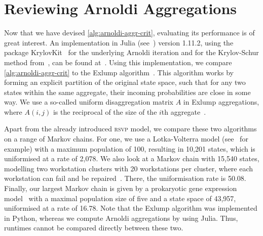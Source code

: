 \documentclass[runningheads]{llncs}
\newcommand*{\abbrev}[1]{\textsc{#1}}
\begin{document}
\section{Reviewing Arnoldi Aggregations}\label{sec:review}
Now that we have devised \cref{alg:arnoldi-aggr-crit}, evaluating its performance is of great interest.
An implementation in Julia (see~\cite{bezanson2017julia}) version 1.11.2, using the package KrylovKit~\cite{haegeman2024krylovkit} for the underlying Arnoldi iteration and for the Krylov-Schur method from~\cite{stewart2002krylovschur}, can be found at~\cite{sonnentag2025implementation}.
Using this implementation, we compare \cref{alg:arnoldi-aggr-crit} to the Exlump algorithm~\cite[Algorithm~3]{michel2025formalbounds}.
This algorithm works by forming an explicit partition of the original state space, such that for any two states within the same aggregate, their incoming probabilities are close in some way.
We use a so-called uniform disaggregation matrix $A$ in Exlump aggregations, where $A(i, j)$ is the reciprocal of the size of the $i$th aggregate~\cite[p.~14]{michel2025formalbounds}.

Apart from the already introduced \abbrev{rsvp} model, we compare these two algorithms on a range of Markov chains.
For one, we use a Lotka-Volterra model (see~\cite{gillespie1977lotkavolterra} for example) with a maximum population of 100, resulting in 10{,}201 states, which is uniformised at a rate of 2{,}078.
We also look at a Markov chain with 15{,}540 states, modelling two workstation clusters with 20 workstations per cluster, where each workstation can fail and be repaired~\cite{haverkort2000workstation}.
There, the uniformisation rate is 50.08.
Finally, our largest Markov chain is given by a prokaryotic gene expression model~\cite{kierzek2001genemodel} with a maximal population size of five and a state space of 43{,}957, uniformised at a rate of 16.78.
Note that the Exlump algorithm was implemented in Python, whereas we compute Arnoldi aggregations by using Julia.
Thus, runtimes cannot be compared directly between these two.
\end{document}
